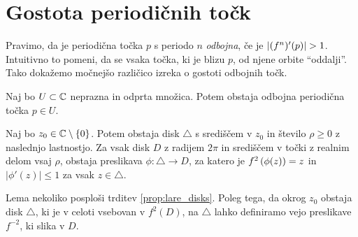 \section{Gostota periodičnih točk}

Pravimo, da je periodična točka \(p\) s periodo \(n\) \emph{odbojna}, če je \(\left\lvert(f^n)' (p)\right\rvert > 1\). Intuitivno to pomeni, da se vsaka točka, ki je blizu \(p\), od njene orbite ``oddalji''. Tako dokažemo močnejšo različico izreka o gostoti odbojnih točk.

\begin{izrek} \label{thm:periodicdense}
    Naj bo \(U \subset \mathbb C\) neprazna in odprta množica. Potem obstaja odbojna periodična točka \(p \in U\).
\end{izrek}

\begin{lema} \label{lem:inversebranches}
    Naj bo \(z_0 \in \mathbb C \setminus \left\{ 0 \right\}\). Potem obstaja disk \(\triangle\) s središčem v \(z_0\) in število \(\rho \geq 0\) z naslednjo lastnostjo. Za vsak disk \(D\) z radijem \(2 \pi\) in središčem v točki z realnim delom vsaj \(\rho\), obstaja preslikava \(\phi \colon \triangle \to D\), za katero je \(f^2 \left( \phi (z) \right) = z\) in \(|\phi' (z)| \leq 1\) za vsak \(z \in \triangle\).
\end{lema}

\noindent Lema nekoliko posploši trditev \ref{prop:lare_disks}. Poleg tega, da okrog \(z_0\) obstaja disk \(\triangle\), ki je v celoti vsebovan v \(f^2 (D)\), na \(\triangle\) lahko definiramo vejo preslikave \(f^{-2}\), ki slika v \(D\).

